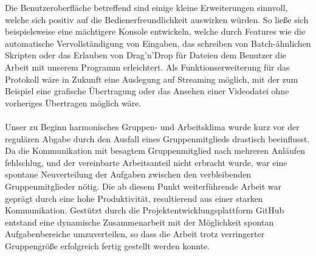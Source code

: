 Die Benutzeroberfläche betreffend sind einige kleine Erweiterungen sinnvoll, welche sich positiv auf die Bedienerfreundlichkeit auswirken würden. 
So ließe sich beispielsweise eine mächtigere Konsole entwickeln, welche durch Features wie die automatische Vervollständigung von Eingaben, das schreiben von Batch-ähnlichen Skripten oder das Erlauben von Drag’n’Drop für Dateien dem Benutzer die Arbeit mit unserem Programm erleichtert.
Als Funktionserweiterung für das Protokoll wäre in Zukunft eine Auslegung auf Streaming möglich, mit der zum Beispiel eine grafische Übertragung oder das Ansehen einer Videodatei ohne vorheriges Übertragen möglich wäre.\\\\
Unser zu Beginn harmonisches Gruppen- und Arbeitsklima wurde kurz vor der regulären Abgabe durch den Ausfall eines Gruppenmitglieds drastisch beeinflusst. 
Da die Kommunikation mit besagtem Gruppenmitglied nach mehreren Anläufen fehlschlug, und der vereinbarte Arbeitsanteil nicht erbracht wurde, war eine spontane Neuverteilung der Aufgaben zwischen den verbleibenden Gruppenmitglieder nötig. 
Die ab diesem Punkt weiterführende Arbeit war geprägt durch eine hohe Produktivität, resultierend aus einer starken Kommunikation.
Gestützt durch die Projektentwicklungsplattform GitHub entstand eine dynamische Zusammenarbeit mit der Möglichkeit spontan Aufgabenbereiche umzuverteilen, so dass die Arbeit trotz verringerter Gruppengröße erfolgreich fertig gestellt werden konnte.
%